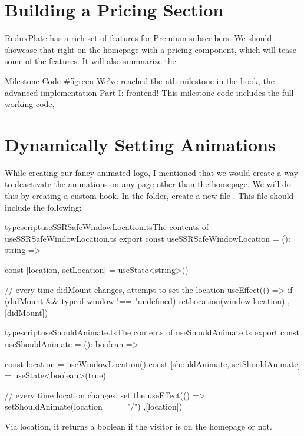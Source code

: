 \documentclass[paper=6in:9in,pagesize=pdftex,headinclude=on,footinclude=on,12pt,twoside]{scrbook}
\begin{document}
\section{Building a Pricing Section}

ReduxPlate has a rich set of features for Premium subscribers. We should showcase that right on the homepage with a pricing component, which will tease some of the features. It will also summarize the .

\begin{highlightBox}{Milestone Code \#5}{green}{\greenCheck}
We've reached the nth milestone in the book, the advanced implementation Part I: frontend! This milestone code includes the full working code, 
\end{highlightBox}

\section{Dynamically Setting Animations}

While creating our fancy animated logo, I mentioned that we would create a way to deactivate the animations on any page other than the homepage. We will do this by creating a custom hook. In the  folder, create a new file . This file should include the following:

\begin{codeInput}{typescript}{useSSRSafeWindowLocation.ts}{The contents of useSSRSafeWindowLocation.ts}
export const useSSRSafeWindowLocation = (): string => {
  const [location, setLocation] = useState<string>()

  // every time didMount changes, attempt to set the location
  useEffect(() => {
    if (didMount && typeof window !== "undefined) {
      setLocation(window.location)
    }
  },[didMount])
}
\end{codeInput}

\begin{codeInput}{typescript}{useShouldAnimate.ts}{The contents of useShouldAnimate.ts}
export const useShouldAnimate = (): boolean => {
  const location = useWindowLocation()
  const [shouldAnimate, setShouldAnimate] = useState<boolean>(true)

  // every time location changes, set the
  useEffect(() => {
    setShouldAnimate(location === "/") 
  },[location])
}
\end{codeInput}

Via location, it returns a boolean if the visitor is on the homepage or not.
\end{document}
